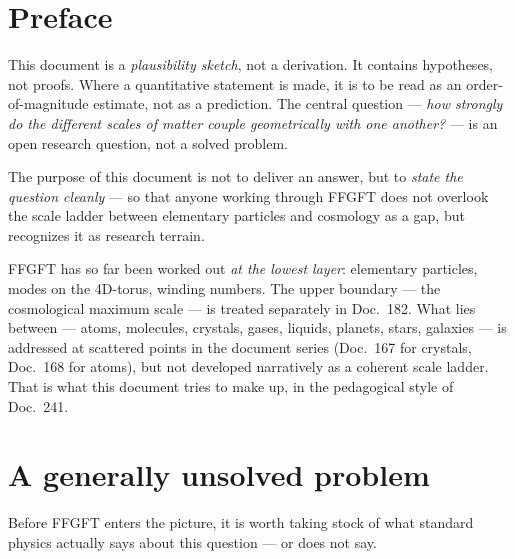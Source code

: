 
\section*{Preface}

This document is a \emph{plausibility sketch}, not a derivation. It
contains hypotheses, not proofs. Where a quantitative statement is
made, it is to be read as an order-of-magnitude estimate, not as a
prediction. The central question --- \emph{how strongly do the
different scales of matter couple geometrically with one another?}
--- is an open research question, not a solved problem.

The purpose of this document is not to deliver an answer, but to
\emph{state the question cleanly} --- so that anyone working through
FFGFT does not overlook the scale ladder between elementary particles
and cosmology as a gap, but recognizes it as research terrain.

FFGFT has so far been worked out \emph{at the lowest layer}:
elementary particles, modes on the 4D-torus, winding numbers. The
upper boundary --- the cosmological maximum scale --- is treated
separately in Doc.~182. What lies between --- atoms, molecules,
crystals, gases, liquids, planets, stars, galaxies --- is addressed
at scattered points in the document series (Doc.~167 for crystals,
Doc.~168 for atoms), but not developed narratively as a coherent
scale ladder. That is what this document tries to make up, in the
pedagogical style of Doc.~241.

\section{A generally unsolved problem}

Before FFGFT enters the picture, it is worth taking stock of what
standard physics actually says about this question --- or does not say.

